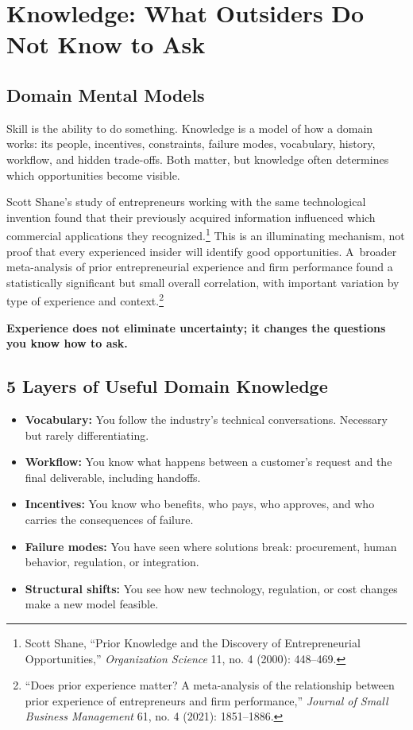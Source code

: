 \section{Knowledge: What Outsiders Do Not Know to Ask}

\subsection{Domain Mental Models}

Skill is the ability to do something. Knowledge is a model of how a domain works: its people, incentives, constraints, failure modes, vocabulary, history, workflow, and hidden trade-offs. Both matter, but knowledge often determines which opportunities become visible.

Scott Shane's study of entrepreneurs working with the same technological invention found that their previously acquired information influenced which commercial applications they recognized.\footnote{Scott Shane, ``Prior Knowledge and the Discovery of Entrepreneurial Opportunities,'' \textit{Organization Science} 11, no. 4 (2000): 448--469.} This is an illuminating mechanism, not proof that every experienced insider will identify good opportunities. A~broader meta-analysis of prior entrepreneurial experience and firm performance found a statistically significant but small overall correlation, with important variation by type of experience and context.\footnote{``Does prior experience matter? A meta-analysis of the relationship between prior experience of entrepreneurs and firm performance,'' \textit{Journal of Small Business Management} 61, no. 4 (2021): 1851--1886.}

\textbf{Experience does not eliminate uncertainty; it changes the questions you know how to ask.}

\subsection{5 Layers of Useful Domain Knowledge}

\begin{itemize}[leftmargin=11pt,itemsep=2pt,topsep=1.5pt,parsep=0pt]
  \item \textbf{Vocabulary:} You follow the industry's technical conversations. Necessary but rarely differentiating.
  \item \textbf{Workflow:} You know what happens between a customer's request and the final deliverable, including handoffs.
  \item \textbf{Incentives:} You know who benefits, who pays, who approves, and who carries the consequences of failure.
  \item \textbf{Failure modes:} You have seen where solutions break: procurement, human behavior, regulation, or integration.
  \item \textbf{Structural shifts:} You see how new technology, regulation, or cost changes make a new model feasible.
\end{itemize}

